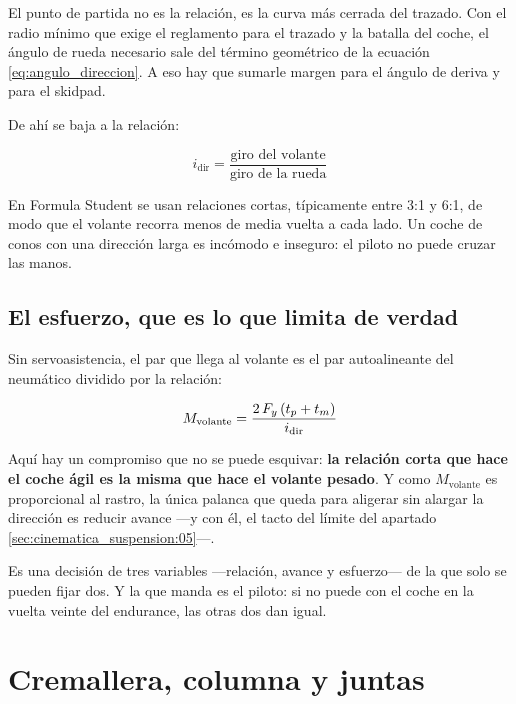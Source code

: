 El punto de partida no es la relación, es la curva más cerrada del trazado. Con
el radio mínimo que exige el reglamento para el trazado y la batalla del coche,
el ángulo de rueda necesario sale del término geométrico de la ecuación
\eqref{eq:angulo_direccion}. A eso hay que sumarle margen para el ángulo de
deriva y para el skidpad.

De ahí se baja a la relación:

\begin{equation}
  i_{\text{dir}} = \frac{\text{giro del volante}}{\text{giro de la rueda}}
  \label{eq:relacion_direccion}
\end{equation}

En Formula Student se usan relaciones cortas, típicamente entre \num{3}:1 y
\num{6}:1, de modo que el volante recorra menos de media vuelta a cada lado. Un
coche de conos con una dirección larga es incómodo e inseguro: el piloto no
puede cruzar las manos.

\subsection{El esfuerzo, que es lo que limita de verdad}

Sin servoasistencia, el par que llega al volante es el par autoalineante del
neumático dividido por la relación:

\begin{equation}
  M_{\text{volante}} = \frac{2\,F_y\,(t_p + t_m)}{i_{\text{dir}}}
  \label{eq:par_volante}
\end{equation}

\begin{clave}
Aquí hay un compromiso que no se puede esquivar: \textbf{la relación corta que
hace el coche ágil es la misma que hace el volante pesado}. Y como
$M_{\text{volante}}$ es proporcional al rastro, la única palanca que queda para
aligerar sin alargar la dirección es reducir avance ---y con él, el tacto del
límite del apartado \ref{sec:cinematica_suspension:05}---.

Es una decisión de tres variables ---relación, avance y esfuerzo--- de la que
solo se pueden fijar dos. Y la que manda es el piloto: si no puede con el coche
en la vuelta veinte del endurance, las otras dos dan igual.
\end{clave}

\section{Cremallera, columna y juntas}
\label{sec:direccion:03}

